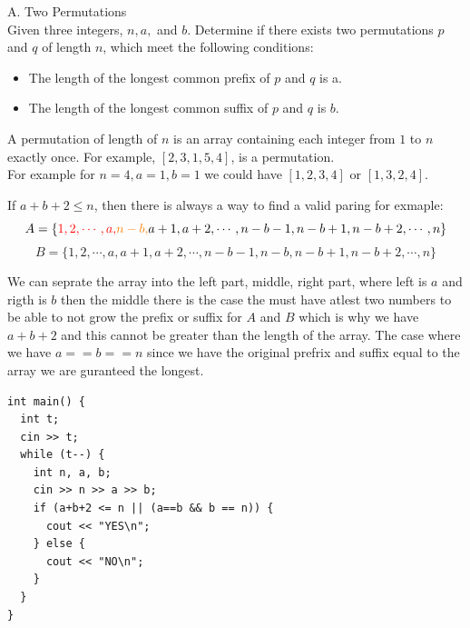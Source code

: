 \documentclass[11pt]{scrartcl}
\begin{document}
\newpage

  \begin{problem}
    A. Two Permutations \\ 

    Given three integers, $n, a,$ and $b$. Determine if there exists two permutations $p$ and $q$ of length $n$, which 
    meet the following conditions: 
      \begin{itemize}
        \item The length of the longest common prefix of $p$ and $q$ is a.
        \item The length of the longest common suffix of $p$ and $q$ is $b$.
      \end{itemize}
      A permutation of length of $n$ is an array containing each integer from $1$ to $n$ exactly once. For 
      example, $[2,3,1,5,4]$, is a permutation. \\ 

      For example for $n = 4, a = 1, b = 1$ we could have $[1,2,3,4]$ or $[1,3,2,4]$.
\end{problem}

\begin{solution}
  If $a + b + 2 \leq n$, then there is always a way to find a valid paring for exmaple:
    \[
        A = \{\textcolor{red}{1,2,\cdots, a,} \textcolor{orange}{n-b,} a+1, a+2, \cdots, n-b-1, n-b+1, n-b+2, \cdots, n\}
    \]
    \[
      B = \{1,2,\cdots,a,a+1,a+2,\cdots,n-b-1,n-b,n-b+1,n-b+2,\cdots, n\}
    \]

    We can seprate the array into the left part, middle, right part, where left is $a$ and rigth is $b$ then the middle there is the
    case the must have atlest two numbers to be able to not grow the prefix or suffix for $A$  and $B$ which is why we have $a + b + 2$ and this 
    cannot be greater than the length of the array. The case where we have $a == b == n$ since we have the original prefrix and suffix equal to the array 
    we are guranteed the longest. 

\begin{lstlisting}
int main() {
  int t;
  cin >> t;
  while (t--) {
    int n, a, b;
    cin >> n >> a >> b;
    if (a+b+2 <= n || (a==b && b == n)) {
      cout << "YES\n";
    } else {
      cout << "NO\n";
    }
  }
}
\end{lstlisting}
\end{solution}
\end{document}
